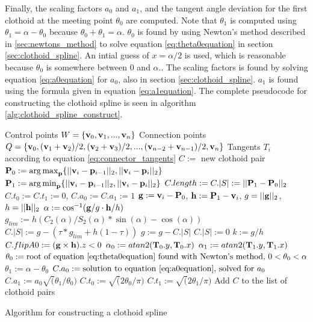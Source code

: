 Finally, the scaling factors $a_0$ and $a_1$, and the tangent angle deviation for the first clothoid at the meeting point $\theta_0$ are computed. Note that $\theta_1$ is computed using $\theta_1 = \alpha - \theta_0$ because $\theta_0 + \theta_1 = \alpha$\cite{clothoid}. $\theta_0$ is found by using Newton's method described in \ref{sec:newtons_method} to solve equation \ref{eq:theta0equation} in section \ref{sec:clothoid_spline}. An intial guess of $x=\alpha/2$ is used, which is reasonable because $\theta_0$ is somewhere between $0$ and $\alpha$.\cite{clothoid}. The scaling factors is found by solving equation \ref{eq:a0equation} for $a_0$, also in section \ref{sec:clothoid_spline}. $a_1$ is found using the formula given in equation \ref{eq:a1equation}. The complete pseudocode for constructing the clothoid spline is seen in algorithm \ref{alg:clothoid_spline_construct}.

\begin{algorithm}[ht]
\centering
\begin{algorithmic}
\REQUIRE Control points $W=\{{\mathbf v}_0, {\mathbf v}_1, ..., {\mathbf v}_n\}$
\REQUIRE Connection points $Q=\{{\mathbf v}_0, ({\mathbf v}_1+{\mathbf v}_2)/2, ({\mathbf v}_2+{\mathbf v}_3)/2, ..., ({\mathbf v}_{n-2}+{\mathbf v}_{n-1})/2, {\mathbf v}_n\}$
\REQUIRE Tangents $T_i$ according to equation \ref{eq:connector_tangents}
\STATE $C := $ new clothoid pair
\STATE ${\mathbf P}_0 := \operatorname*{arg\,max}_{{\mathbf p}} \{||{\mathbf v}_i-{\mathbf p}_{i-1}||_2, ||{\mathbf v}_i-{\mathbf p}_i||_2\}$
\STATE ${\mathbf P}_1 := \operatorname*{arg\,min}_{{\mathbf p}} \{||{\mathbf v}_i-{\mathbf p}_{i-1}||_2, ||{\mathbf v}_i-{\mathbf p}_i||_2\}$
\STATE $C.length := C.|S| := ||{\mathbf P}_1 - {\mathbf P}_0||_2$
\STATE $C.t_0 := C.t_1 := 0$, $C.a_0 := C.a_1 := 1$
\ENDIF
\STATE ${\mathbf g} := {\mathbf v}_i-{\mathbf P}_0$, ${\mathbf h} := {\mathbf P}_1-{\mathbf v}_i$, $g = ||{\mathbf g}||_2$, $h = ||{\mathbf h}||_2$
\STATE $\alpha := \cos^{-1}({\mathbf g}/g \cdot {\mathbf h}/h)$
\STATE $g_{lim} := h(C_2(\alpha)/S_2(\alpha)*\sin(\alpha) - \cos(\alpha))$
    \STATE $C.|S| := g - (\tau*g_{lim} + h(1-\tau))$
    \STATE $g := g - C.|S|$
\ELSE
    \STATE $C.|S| := 0$
\ENDIF
\STATE $k := g/h$
\STATE $C.flipA0 := ({\mathbf g} \times {\mathbf h}).z < 0$
\STATE $\alpha_0 := atan2({\mathbf T}_0.y, {\mathbf T}_0.x)$
\STATE $\alpha_1 := atan2({\mathbf T}_1.y, {\mathbf T}_1.x)$
\STATE {}
\STATE $\theta_0 := \mbox{root of equation \ref{eq:theta0equation} found with Newton's method, $0 < \theta_0 < \alpha$}$
\STATE $\theta_1 := \alpha - \theta_0$
\STATE $C.a_0 := \mbox{solution to equation \ref{eq:a0equation}, solved for $a_0$}$
\STATE $C.a_1 := a_0\sqrt(\theta_1/\theta_0)$
\STATE $C.t_0 := \sqrt(2\theta_0/\pi)$
\STATE $C.t_1 := \sqrt(2\theta_1/\pi)$
\STATE Add $C$ to the list of clothoid pairs
\ENDFOR
\end{algorithmic}

\caption{Algorithm for constructing a clothoid spline}
\label{alg:clothoid_spline_construct}
\end{algorithm}

